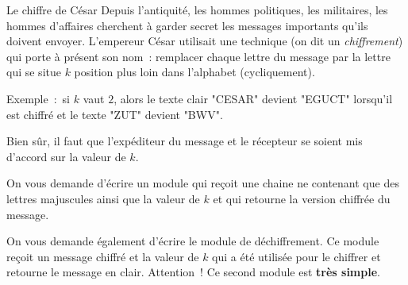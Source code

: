 \begin{Exercice}{Le chiffre de César}
	\label{ex:cesar}
	Depuis l'antiquité, les hommes politiques, les militaires, 
	les hommes d'affaires cherchent à garder secret les messages
	importants qu'ils doivent envoyer.
	L'empereur César utilisait une technique (on dit un \emph{chiffrement})
	qui porte à présent son nom~:
	remplacer chaque lettre du message par la lettre qui se situe 
	$k$ position plus loin dans l'alphabet (cycliquement).
	
	Exemple~:~si $k$ vaut $2$, 
	alors le texte clair "CESAR" devient "EGUCT" lorsqu'il est chiffré 
	et le texte "ZUT" devient "BWV".
	
	Bien sûr, il faut que l'expéditeur du message et le récepteur
	se soient mis d'accord sur la valeur de $k$.
	
	On vous demande d'écrire un module qui reçoit une chaine ne contenant
	que des lettres majuscules ainsi que la valeur de $k$ et qui retourne
	la version chiffrée du message.

	On vous demande également d'écrire le module de déchiffrement.
	Ce module reçoit un message chiffré et la valeur de $k$ qui a été
	utilisée pour le chiffrer et retourne le message en clair.
	Attention~! Ce second module est \textbf{très simple}.



	
\end{Exercice}
